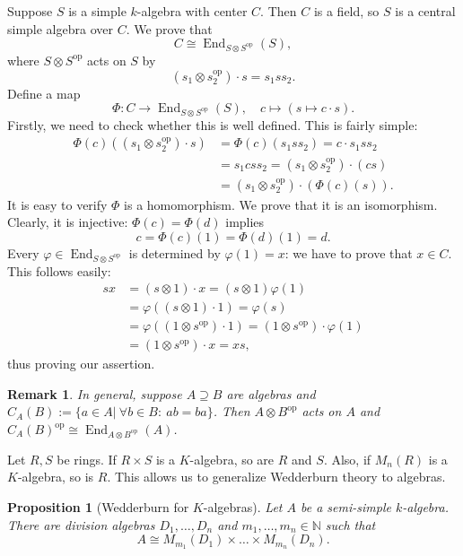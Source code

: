 \documentclass[10pt, a4paper]{article}
\newtheorem{proposition}[thm]{Proposition}
\newtheorem*{remark}{Remark}
\newcommand{\N}{\mathbb {N}}
\DeclareMathOperator{\op}{op}
\DeclareMathOperator{\en}{End}
\begin{document}
Suppose $S$ is a simple $k$-algebra with center $C$. Then $C$ is a field, so $S$ is a central simple algebra over $C$.
We prove that 
$$C \cong \en _{S \otimes S^{\op}} (S),$$
where $S \otimes S^{\op}$ acts on $S$ by 
$$(s_1 \otimes s_2 ^{\op}) \cdot s = s_1 s s_2.$$
Define a map 
$$\Phi:  C \to \en_{S \otimes S^{\op}} (S),\quad c \mapsto (s \mapsto c \cdot s).$$
Firstly, we need to check whether this is well defined.
This is fairly simple:
\begin{align*}
  \Phi(c) ((s_1 \otimes s_2^{\op}) \cdot s) &= \Phi(c) (s_1 s s_2) = c \cdot s_1 s s_2\\
  &= s_1 c s s_2 = (s_1 \otimes s_2^{\op}) \cdot (cs)\\
  &= (s_1 \otimes s_2^{\op}) \cdot (\Phi(c) (s)).
\end{align*}
It is easy to verify $\Phi$ is a homomorphism. We prove that it is an isomorphism.
Clearly, it is injective:
$\Phi(c) = \Phi(d)$ implies 
$$c = \Phi(c) (1) = \Phi(d) (1) = d.$$
Every $\varphi \in \en_{S \otimes S^{\op}}$ is determined by $\varphi(1) = x$:
we have to prove that $x \in C$.
This follows easily:
\begin{align*}
  sx &= (s \otimes 1) \cdot x = (s \otimes 1) \varphi(1)\\
  &= \varphi((s \otimes 1) \cdot 1) = \varphi(s)\\
  &= \varphi((1 \otimes s^{\op}) \cdot 1) = (1 \otimes s^{\op}) \cdot \varphi(1)\\
  &= (1 \otimes s^{\op}) \cdot x = xs,
\end{align*}
thus proving our assertion.

\begin{remark}
  In general, suppose $A \supseteq B$ are algebras and $C_A (B) := \{a \in A|\ \forall b \in B:\ ab = ba\}$.
Then $A \otimes B^{\op}$ acts on $A$ and $C_A (B) ^{\op} \cong \en _{A \otimes B^{\op}} (A)$. 
\end{remark}

  Let $R,S$ be rings. If $R\times S$ is a $K$-algebra, so are $R$ and $S$.
  Also, if $M_n(R)$ is a $K$-algebra, so is $R$. This allows us to generalize
Wedderburn theory to algebras.

\begin{proposition}[Wedderburn for $K$-algebras]
  Let $A$ be a semi-simple $k$-algebra. There are division algebras $D_1,\dots ,D_n$ and $m_1,\dots ,m_n \in \N$ such that
  $$A \cong M_{m_1}(D_1)\times\dots \times M_{m_n}(D_n).$$
\end{proposition}
\end{document}
